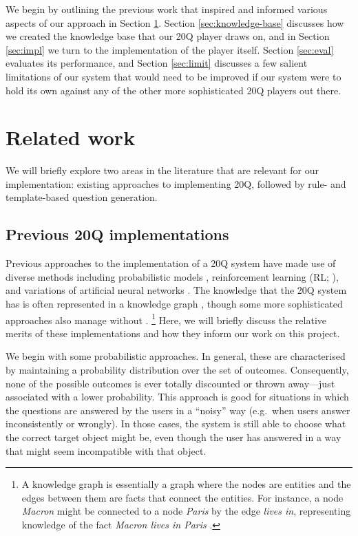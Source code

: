 \documentclass[11pt,a4paper]{article}
\begin{document}
We begin by outlining the previous work that inspired and informed various aspects of our approach in Section \ref{sec:litreview}.
Section \ref{sec:knowledge-base} discusses how we created the knowledge base that our 20Q player draws on, and in Section \ref{sec:impl} we turn to the implementation of the player itself.
Section \ref{sec:eval} evaluates its performance, and Section \ref{sec:limit} discusses a few salient limitations of our system that would need to be improved if our system were to hold its own against any of the other more sophisticated 20Q players out there.

\section{Related work}
\label{sec:litreview}

We will briefly explore two areas in the literature that are relevant for our implementation: existing approaches to implementing 20Q, followed by rule- and template-based question generation.

\subsection{Previous 20Q implementations}
\label{subsec:prev20q}

Previous approaches to the implementation of a 20Q system have made use of diverse methods including probabilistic models \citep{DeyEa2019}, reinforcement learning (RL; \citealt{HuEa2018}), and variations of artificial neural networks \citep{ReddyEa2017, Burgener2006, ToninEa2018}.
The knowledge that the 20Q system has is often represented in a knowledge graph \citep[e.g.][]{DeyEa2019}, though some more sophisticated approaches also manage without \citep[e.g.][]{HuEa2018}.%
\footnote{A knowledge graph is essentially a graph where the nodes are entities and the edges between them are facts that connect the entities.
	For instance, a node \textit{Macron} might be connected to a node \textit{Paris} by the edge \textit{lives in}, representing knowledge of the fact \textit{Macron lives in Paris} \citep[example from][]{GodinEa2019}.}
Here, we will briefly discuss the relative merits of these implementations and how they inform our work on this project.

We begin with some probabilistic approaches.
In general, these are characterised by maintaining a probability distribution over the set of outcomes.
Consequently, none of the possible outcomes is ever totally discounted or thrown away---just associated with a lower probability.
This approach is good for situations in which the questions are answered by the users in a ``noisy'' way (e.g.\ when users answer inconsistently or wrongly).
In those cases, the system is still able to choose what the correct target object might be, even though the user has answered in a way that might seem incompatible with that object.
\end{document}
